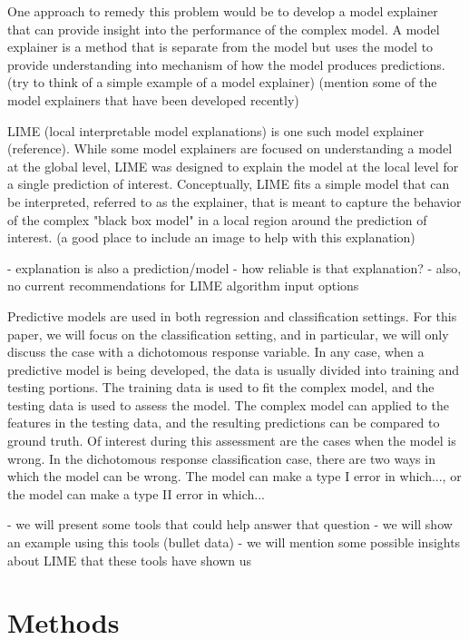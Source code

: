 \documentclass[AMS,STIX2COL]{WileyNJD-v2}
\begin{document}
One approach to remedy this problem would be to develop a model explainer that can provide insight into the performance of the complex model. A model explainer is a method that is separate from the model but uses the model to provide understanding into mechanism of how the model produces predictions. (try to think of a simple example of a model explainer) (mention some of the model explainers that have been developed recently)

LIME (local interpretable model explanations) is one such model explainer (reference). While some model explainers are focused on understanding a model at the global level, LIME was designed to explain the model at the local level for a single prediction of interest. Conceptually, LIME fits a simple model that can be interpreted, referred to as the explainer, that is meant to capture the behavior of the complex "black box model" in a local region around the prediction of interest. (a good place to include an image to help with this explanation)

- explanation is also a prediction/model
  - how reliable is that explanation?
  - also, no current recommendations for LIME algorithm input options

Predictive models are used in both regression and classification settings. For this paper, we will focus on the classification setting, and in particular, we will only discuss the case with a dichotomous response variable. In any case, when a predictive model is being developed, the data is usually divided into training and testing portions. The training data is used to fit the complex model, and the testing data is used to assess the model. The complex model can applied to the features in the testing data, and the resulting predictions can be compared to ground truth. Of interest during this assessment are the cases when the model is wrong. In the dichotomous response classification case, there are two ways in which the model can be wrong. The model can make a type I error in which..., or the model can make a type II error in which...

- we will present some tools that could help answer that question
- we will show an example using this tools (bullet data)
- we will mention some possible insights about LIME that these tools have shown us

\section{Methods}
\end{document}
